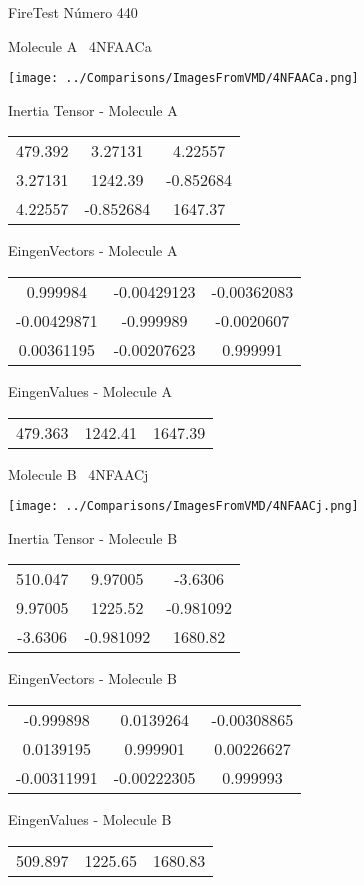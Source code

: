 \vtab[-3cm]
\begin{center}
{\large FireTest \tab Número 440}
\end{center}
\begin{multicols}{2}
\begin{center}

Molecule A \
4NFAACa

\texttt{[image: ../Comparisons/ImagesFromVMD/4NFAACa.png]}

Inertia Tensor - Molecule A \\
\begin{tabular}{|c c c|}
479.392	 & 	3.27131	 & 	4.22557	 \\
3.27131	 & 	1242.39	 & 	-0.852684	 \\
4.22557	 & 	-0.852684	 & 	1647.37
\end{tabular}

\vtab
 EingenVectors - Molecule A     \\
\begin{tabular}{|c c c|}
0.999984	 & 	-0.00429123	 & 	-0.00362083	 \\
-0.00429871	 & 	-0.999989	 & 	-0.0020607	 \\
0.00361195	 & 	-0.00207623	 & 	0.999991
\end{tabular}

\vtab
 EingenValues - Molecule A     \\
\begin{tabular}{|c c c|}
479.363	 & 	1242.41	 & 	1647.39	 \\
\end{tabular}
\columnbreak

Molecule B \
4NFAACj

\texttt{[image: ../Comparisons/ImagesFromVMD/4NFAACj.png]}

Inertia Tensor - Molecule B \\
\begin{tabular}{|c c c|}
510.047	 & 	9.97005	 & 	-3.6306	 \\
9.97005	 & 	1225.52	 & 	-0.981092	 \\
-3.6306	 & 	-0.981092	 & 	1680.82
\end{tabular}

\vtab
 EingenVectors - Molecule B     \\
\begin{tabular}{|c c c|}
-0.999898	 & 	0.0139264	 & 	-0.00308865	 \\
0.0139195	 & 	0.999901	 & 	0.00226627	 \\
-0.00311991	 & 	-0.00222305	 & 	0.999993
\end{tabular}

\vtab
 EingenValues - Molecule B     \\
\begin{tabular}{|c c c|}
509.897	 & 	1225.65	 & 	1680.83	 \\
\end{tabular}

\end{center}
\end{multicols}

